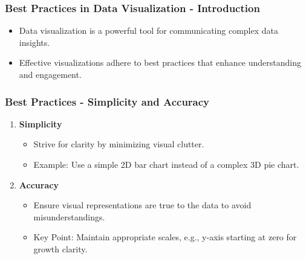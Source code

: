 \documentclass[aspectratio=169]{beamer}
\begin{document}
\begin{frame}[fragile]
    \frametitle{Best Practices in Data Visualization - Introduction}
    \begin{itemize}
        \item Data visualization is a powerful tool for communicating complex data insights.
        \item Effective visualizations adhere to best practices that enhance understanding and engagement.
    \end{itemize}
\end{frame}

\begin{frame}[fragile]
    \frametitle{Best Practices - Simplicity and Accuracy}
    \begin{enumerate}
        \item \textbf{Simplicity}
            \begin{itemize}
                \item Strive for clarity by minimizing visual clutter.
                \item Example: Use a simple 2D bar chart instead of a complex 3D pie chart.
            \end{itemize}

        \item \textbf{Accuracy}
            \begin{itemize}
                \item Ensure visual representations are true to the data to avoid misunderstandings.
                \item Key Point: Maintain appropriate scales, e.g., y-axis starting at zero for growth clarity.
            \end{itemize}
    \end{enumerate}
\end{frame}
\end{document}
